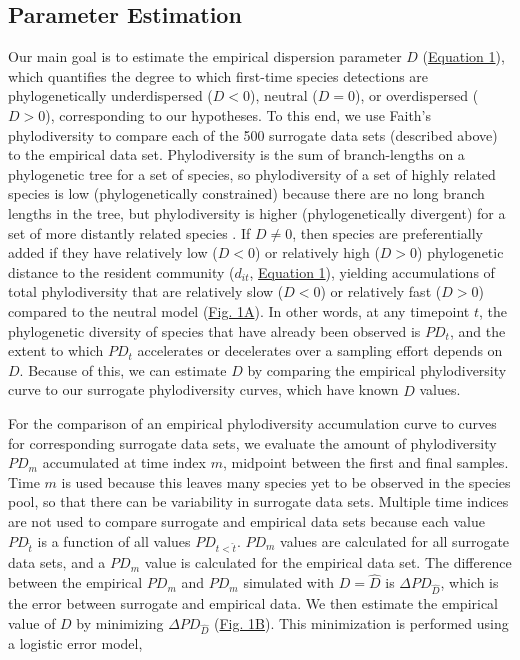 \documentclass{article}
\begin{document}
\subsection{Parameter Estimation} \label{sec:parameterEstimation}
Our main goal is to estimate the empirical dispersion parameter \(D\) (\hyperref[sec:equation1]{Equation 1}), which quantifies the degree to which first-time species detections are phylogenetically underdispersed (\(D<0\)), neutral (\(D=0\)), or overdispersed (\(D>0\)), corresponding to our hypotheses. To this end, we use Faith's phylodiversity \cite{Faith1992} to compare each of the 500 surrogate data sets (described above) to the empirical data set. Phylodiversity is the sum of branch-lengths on a phylogenetic tree for a set of species, so phylodiversity of a set of highly related species is low (phylogenetically constrained) because there are no long branch lengths in the tree, but phylodiversity is higher (phylogenetically divergent) for a set of more distantly related species \cite{Faith1992}. If \(D\neq0\), then species are preferentially added if they have relatively low (\(D<0\)) or relatively high (\(D>0\)) phylogenetic distance to the resident community (\(d_{it}\), \hyperref[sec:equation1]{Equation 1}), yielding accumulations of total phylodiversity that are relatively slow (\(D<0\)) or relatively fast (\(D>0\)) compared to the neutral model (\hyperref[sec:figure1]{Fig. 1A}). In other words, at any timepoint \(t\), the phylogenetic diversity of species that have already been observed is \(PD_t\), and the extent to which \(PD_t\) accelerates or decelerates over a sampling effort depends on \(D\). Because of this, we can estimate \(D\) by comparing the empirical phylodiversity curve to our surrogate phylodiversity curves, which have known \(\hat{D}\) values.
\par
For the comparison of an empirical phylodiversity accumulation curve to curves for corresponding surrogate data sets, we evaluate the amount of phylodiversity \(PD_m\) accumulated at time index \(m\), midpoint between the first and final samples. Time \(m\) is used because this leaves many species yet to be observed in the species pool, so that there can be variability in surrogate data sets. Multiple time indices are not used to compare surrogate and empirical data sets because each value \(PD_{\hat{t}}\) is a function of all values \(PD_{t<\hat{t}}\). \(PD_m\) values are calculated for all surrogate data sets, and a \(PD_m\) value is calculated for the empirical data set. The difference between the empirical \(PD_m\) and \(PD_m\) simulated with \(D=\hat{D}\) is \(\Delta PD_{\hat{D}}\), which is the error between surrogate and empirical data. We then estimate the empirical value of \(D\) by minimizing \(\Delta PD_{\hat{D}}\) (\hyperref[sec:figure1]{Fig. 1B}). This minimization is performed using a logistic error model,
\end{document}
